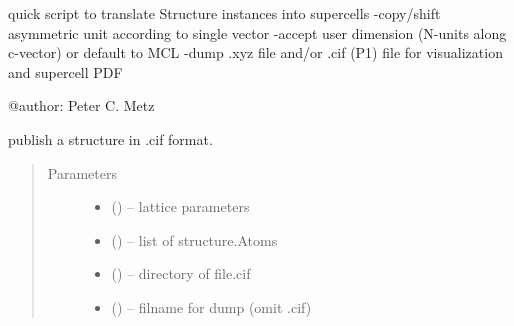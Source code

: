 \documentclass[letterpaper,10pt,english]{sphinxmanual}
\begin{document}
quick script to translate Structure instances into supercells
-copy/shift asymmetric unit according to single vector
-accept user dimension (N-units along c-vector) or default to MCL
-dump .xyz file and/or .cif (P1) file for visualization and supercell PDF


\begin{fulllineitems}
\end{fulllineitems}



\begin{fulllineitems}
\end{fulllineitems}



\begin{fulllineitems}
\end{fulllineitems}


@author: Peter C. Metz

\begin{fulllineitems}
\label{\detokenize{rst/supercell:mstack.supercell.pub_cif}}
publish a structure in .cif format.
\begin{quote}\begin{description}
\item[{Parameters}] \leavevmode\begin{itemize}
\item {} 
\sphinxstyleliteralstrong{, }\sphinxstyleliteralstrong{, } (\sphinxstyleliteralemphasis{,}\sphinxstyleliteralemphasis{}) -- lattice parameters

\item {} 
 () -- list of structure.Atoms

\item {} 
 () -- directory of file.cif

\item {} 
 () -- filname for dump (omit .cif)

\end{itemize}

\end{description}\end{quote}

\end{fulllineitems}
\end{document}
